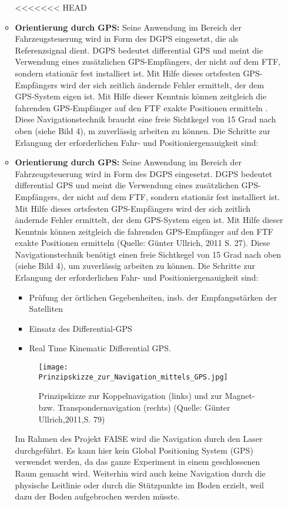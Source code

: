 \begin{itemize}
\begin{itemize}
<<<<<<< HEAD
	\item \textbf{Orientierung durch GPS:} Seine Anwendung im Bereich der Fahrzeugsteuerung wird in Form des DGPS eingesetzt, die als Referenzsignal dient. DGPS bedeutet differential GPS und meint die Verwendung eines zus\"atzlichen GPS-Empf\"angers, der nicht auf dem FTF, sondern station\"ar fest installiert ist. Mit Hilfe dieses ortsfesten GPS-Empf\"angers wird der sich zeitlich \"andernde Fehler ermittelt, der dem GPS-System eigen ist. Mit Hilfe dieser Kenntnis k\"onnen zeitgleich die fahrenden GPS-Empf\"anger auf den FTF exakte Positionen ermitteln \cite[S. 27]{Guenther:2011}. Diese Navigationstechnik braucht eine freie Sichtkegel von 15 Grad  nach oben (siehe Bild 4), m zuverl\"assig arbeiten zu k\"onnen. Die Schritte zur Erlangung der erforderlichen Fahr- und Positioniergenauigkeit sind:
	\item \textbf{Orientierung durch GPS:} Seine Anwendung im Bereich der Fahrzeugsteuerung wird in Form des DGPS eingesetzt.
DGPS bedeutet differential GPS und meint die Verwendung eines zus\"atzlichen GPS-Empf\"angers, der nicht auf dem FTF, sondern station\"ar fest installiert ist.
Mit Hilfe dieses ortsfesten GPS-Empf\"angers wird der sich zeitlich \"andernde Fehler ermittelt, der dem GPS-System eigen ist.
Mit Hilfe dieser Kenntnis k\"onnen zeitgleich die fahrenden GPS-Empf\"anger auf den FTF exakte Positionen ermitteln (Quelle: G\"unter Ullrich, 2011 S. 27).
Diese Navigationstechnik benötigt einen freie Sichtkegel von 15 Grad nach oben (siehe Bild 4), um zuverl\"assig arbeiten zu k\"onnen.
Die Schritte zur Erlangung der erforderlichen Fahr- und Positioniergenauigkeit sind:
	\begin{itemize}
		\item Pr\"ufung der \"ortlichen Gegebenheiten, insb. der Empfangsst\"arken der Satelliten
 \item Einsatz des Differential-GPS
 \item Real Time Kinematic Differential GPS. 
\end{itemize}
	\begin{figure}[h!]
		\centering
		\texttt{[image: Prinzipskizze\_zur\_Navigation\_mittels\_GPS.jpg]}
		\caption{Prinzipskizze zur Koppelnavigation (links) und zur Magnet- bzw. Transpondernavigation (rechts) (Quelle: G\"unter Ullrich,2011,S. 79)}
		\label{Systemarchitektur_FTS}
\end{figure}
Im Rahmen des Projekt FAISE wird die Navigation durch den Laser durchgef\"uhrt. Es kann hier kein Global Positioning System (GPS) verwendet werden, da das ganze Experiment in einem geschlossenen Raum gemacht wird.
Weiterhin wird auch keine Navigation durch die physische Leitlinie oder durch die St\"utzpunkte im Boden erzielt, weil dazu der Boden aufgebrochen werden m\"usste.
\end{itemize}


\end{itemize}

